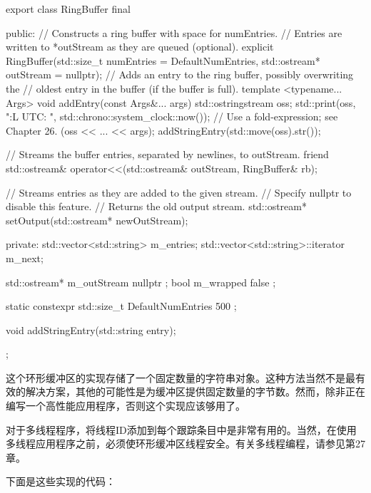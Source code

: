 \begin{cpp}
export class RingBuffer final
{
    public:
        // Constructs a ring buffer with space for numEntries.
        // Entries are written to *outStream as they are queued (optional).
        explicit RingBuffer(std::size_t numEntries = DefaultNumEntries,
            std::ostream* outStream = nullptr);
        // Adds an entry to the ring buffer, possibly overwriting the
        // oldest entry in the buffer (if the buffer is full).
        template <typename... Args>
        void addEntry(const Args&... args)
        {
            std::ostringstream oss;
            std::print(oss, "{:L} UTC: ", std::chrono::system_clock::now());
            // Use a fold-expression; see Chapter 26.
            (oss << ... << args);
            addStringEntry(std::move(oss).str());
        }

        // Streams the buffer entries, separated by newlines, to outStream.
        friend std::ostream& operator<<(std::ostream& outStream, RingBuffer& rb);

        // Streams entries as they are added to the given stream.
        // Specify nullptr to disable this feature.
        // Returns the old output stream.
        std::ostream* setOutput(std::ostream* newOutStream);

    private:
        std::vector<std::string> m_entries;
        std::vector<std::string>::iterator m_next;

        std::ostream* m_outStream { nullptr };
        bool m_wrapped { false };

        static constexpr std::size_t DefaultNumEntries { 500 };

        void addStringEntry(std::string entry);
};
\end{cpp}


这个环形缓冲区的实现存储了一个固定数量的字符串对象。这种方法当然不是最有效的解决方案，其他的可能性是为缓冲区提供固定数量的字节数。然而，除非正在编写一个高性能应用程序，否则这个实现应该够用了。

对于多线程程序，将线程ID添加到每个跟踪条目中是非常有用的。当然，在使用多线程应用程序之前，必须使环形缓冲区线程安全。有关多线程编程，请参见第27章。

下面是这些实现的代码：

